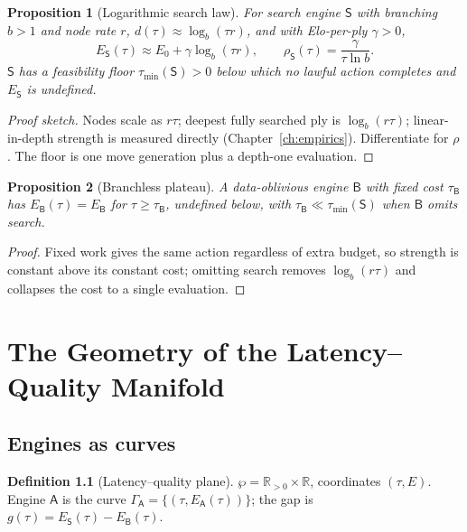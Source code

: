 \documentclass[11pt,oneside]{book}
\theoremstyle{definition}
\newtheorem{definition}{Definition}[chapter]
\theoremstyle{plain}
\newtheorem{proposition}{Proposition}[chapter]
\theoremstyle{remark}
\newcommand{\Elo}{E}
\newcommand{\Engine}{\mathsf{A}}
\newcommand{\Search}{\mathsf{S}}
\newcommand{\Branchless}{\mathsf{B}}
\newcommand{\budget}{\tau}
\newcommand{\skill}{\rho}
\newcommand{\Reals}{\mathbb{R}}
\newcommand{\Rpos}{\Reals_{>0}}
\begin{document}
\begin{proposition}[Logarithmic search law]\label{prop:searchlaw}
For search engine $\Search$ with branching $b>1$ and node rate $r$,
$d(\budget)\approx\log_b(\budget r)$, and with Elo-per-ply $\gamma>0$,
\[
  \Elo_\Search(\budget)\approx\Elo_0+\gamma\log_b(\budget r),\qquad
  \skill_\Search(\budget)=\frac{\gamma}{\budget\ln b}.
\]
$\Search$ has a feasibility floor $\budget_{\min}(\Search)>0$ below which no lawful action
completes and $\Elo_\Search$ is undefined.
\end{proposition}
\begin{proof}[Proof sketch]
Nodes scale as $r\budget$; deepest fully searched ply is $\log_b(r\budget)$;
linear-in-depth strength is measured directly (Chapter~\ref{ch:empirics}). Differentiate
for $\skill$. The floor is one move generation plus a depth-one evaluation.
\end{proof}

\begin{proposition}[Branchless plateau]\label{prop:plateau}
A data-oblivious engine $\Branchless$ with fixed cost $\budget_\Branchless$ has
$\Elo_\Branchless(\budget)=\Elo_\Branchless$ for $\budget\ge\budget_\Branchless$, undefined
below, with $\budget_\Branchless\ll\budget_{\min}(\Search)$ when $\Branchless$ omits search.
\end{proposition}
\begin{proof}
Fixed work gives the same action regardless of extra budget, so strength is constant above
its constant cost; omitting search removes $\log_b(r\budget)$ and collapses the cost to a
single evaluation.
\end{proof}

\chapter{The Geometry of the Latency--Quality Manifold}\label{ch:geometry}

\section{Engines as curves}
\begin{definition}[Latency--quality plane]
$\wp=\Rpos\times\Reals$, coordinates $(\budget,\Elo)$. Engine $\Engine$ is the curve
$\Gamma_\Engine=\{(\budget,\Elo_\Engine(\budget))\}$; the gap is
$g(\budget)=\Elo_\Search(\budget)-\Elo_\Branchless(\budget)$.
\end{definition}
\end{document}
